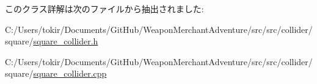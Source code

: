 このクラス詳解は次のファイルから抽出されました\+:\begin{DoxyCompactItemize}
\item 
C\+:/\+Users/tokir/\+Documents/\+Git\+Hub/\+Weapon\+Merchant\+Adventure/src/src/collider/square/\mbox{\hyperlink{square__collider_8h}{square\+\_\+collider.\+h}}\item 
C\+:/\+Users/tokir/\+Documents/\+Git\+Hub/\+Weapon\+Merchant\+Adventure/src/src/collider/square/\mbox{\hyperlink{square__collider_8cpp}{square\+\_\+collider.\+cpp}}\end{DoxyCompactItemize}
